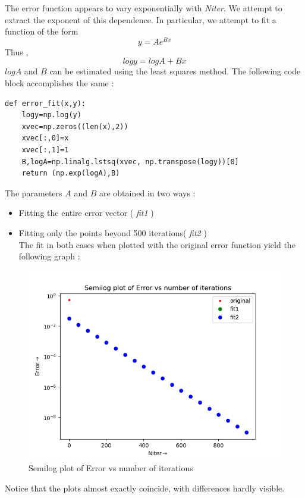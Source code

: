 \documentclass[11pt, a4paper]{article}
\begin{document}
The error function appears to vary exponentially with \textit{Niter}. We attempt to extract the exponent of this dependence.  In  particular, we attempt to fit a function of the form
\begin{equation*}
y = Ae^{Bx}
\end{equation*}
Thus ,
\begin{equation*}
logy = logA + Bx
\end{equation*}
$logA$ and $B$ can be estimated using the least squares method. The following code block accomplishes the same :
\begin{verbatim}
def error_fit(x,y):
    logy=np.log(y)
    xvec=np.zeros((len(x),2))
    xvec[:,0]=x
    xvec[:,1]=1
    B,logA=np.linalg.lstsq(xvec, np.transpose(logy))[0]
    return (np.exp(logA),B)
\end{verbatim}
The parameters $A$ and $B$ are obtained in two ways : 
\begin{itemize}
\item Fitting the entire error vector ( \textit{fit1} )
\item Fitting only the points beyond 500 iterations( \textit{fit2} )
\\
\newpage
The fit in both cases when plotted with the original error function yield the following graph : 
\end{itemize}
  \begin{figure}[!h]
 \centering
 \includegraphics[scale=0.4]{semilog2.png}
 \caption{Semilog plot of Error vs number of iterations}
 \end{figure}
 
 Notice that the plots almost exactly coincide, with differences hardly visible. 
 
\end{document}
